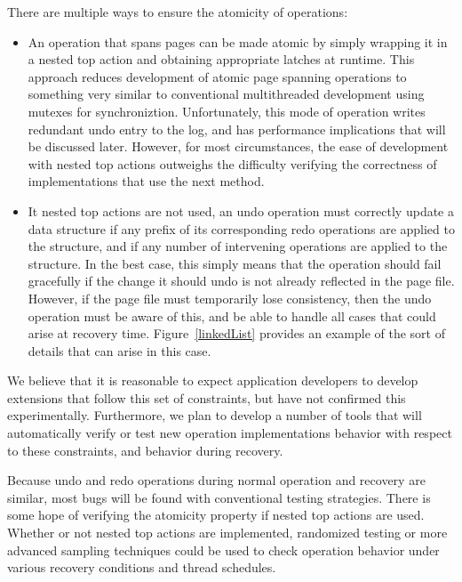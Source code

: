 \documentclass[letterpaper,twocolumn,english]{article}
\begin{document}
There are multiple ways to ensure the atomicity of operations:

\begin{itemize}
\item An operation that spans pages can be made atomic by simply
wrapping it in a nested top action and obtaining appropriate latches
at runtime.  This approach reduces development of atomic page spanning
operations to something very similar to conventional multithreaded
development using mutexes for synchroniztion.  Unfortunately, this
mode of operation writes redundant undo entry to the log, and has
performance implications that will be discussed later.  However, for
most circumstances, the ease of development with nested top actions
outweighs the difficulty verifying the correctness of implementations
that use the next method.

\item It nested top actions are not used, an undo operation must
correctly update a data structure if any prefix of its corresponding
redo operations are applied to the structure, and if any number of
intervening operations are applied to the structure.  In the best
case, this simply means that the operation should fail gracefully if
the change it should undo is not already reflected in the page file.
However, if the page file must temporarily lose consistency, then the
undo operation must be aware of this, and be able to handle all cases
that could arise at recovery time.  Figure~\ref{linkedList} provides
an example of the sort of details that can arise in this case.
\end{itemize}

We believe that it is reasonable to expect application developers to
develop extensions that follow this set of constraints, but have not
confirmed this experimentally.  Furthermore, we plan to develop a
number of tools that will automatically verify or test new operation
implementations behavior with respect to these constraints, and
behavior during recovery.

Because undo and redo operations during normal operation and recovery
are similar, most bugs will be found with conventional testing
strategies.  There is some hope of verifying the atomicity property if
nested top actions are used.  Whether or not nested top actions are
implemented, randomized testing or more advanced sampling techniques
could be used to check operation behavior under various recovery
conditions and thread schedules.~\cite{OSDIFSModelChecker}
\end{document}
